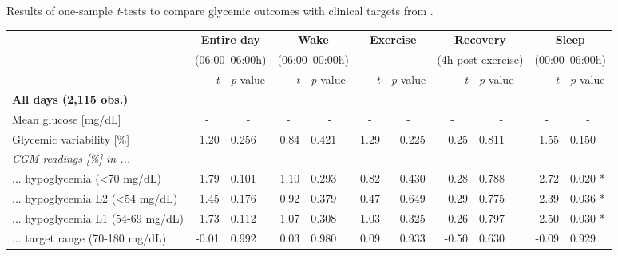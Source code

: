 \documentclass[11pt,a4paper]{article}
\newcommand{\nl}[0]{\textcolor{white}{<}}
\begin{document}
\newpage
\hspace*{-1.2cm}
\begin{threeparttable}
    \caption[Statistical comparison of glycemic outcomes with clinical targets]{Results of one-sample \textit{t}-tests to compare glycemic outcomes with clinical targets from \citet{31177185}.}
    \label{tab:ttest-onesamp}
    \scriptsize
    \centering
    \begin{tabular}{@{}l rl rl rl rl rl@{}}
        \toprule
        & \multicolumn{2}{c}{\textbf{Entire day}} & \multicolumn{2}{c}{\textbf{Wake}} & \multicolumn{2}{c}{\textbf{Exercise}} & \multicolumn{2}{c}{\textbf{Recovery}} & \multicolumn{2}{c}{\textbf{Sleep}}\\
        & \multicolumn{2}{c}{(06:00--06:00h)} & \multicolumn{2}{c}{(06:00--00:00h)} & & & \multicolumn{2}{c}{(4h post-exercise)} & \multicolumn{2}{c}{(00:00--06:00h)}\\
        & \textit{t} & \textit{p}-value & \textit{t} & \textit{p}-value & \textit{t} & \textit{p}-value & \textit{t} & \textit{p}-value & \textit{t} & \textit{p}-value \\ 
        \midrule
        \textbf{All days (2,115 obs.)}\\
        Mean glucose [mg/dL] & \multicolumn{1}{c}{-} & \multicolumn{1}{c}{-} & \multicolumn{1}{c}{-} & \multicolumn{1}{c}{-} & \multicolumn{1}{c}{-} & \multicolumn{1}{c}{-} & \multicolumn{1}{c}{-} & \multicolumn{1}{c}{-} & \multicolumn{1}{c}{-} & \multicolumn{1}{c}{-}\\
        Glycemic variability [\%]                         &  1.20 &  0.256 &  0.84 &  0.421 &  1.29 & \nl0.225     &  0.25 &  0.811 &  1.55 &  0.150   \\
        \textit{CGM readings [\%] in ...} \\
        ... hypoglycemia (<70 mg/dL)                      &  1.79 &  0.101 &  1.10 &  0.293 &  0.82	& \nl0.430     &  0.28 &  0.788 &  2.72 &  0.020 * \\
        \hspace{3mm} ... hypoglycemia L2 (<54 mg/dL)      &  1.45 &  0.176 &  0.92 &  0.379 &  0.47 & \nl0.649     &  0.29 &  0.775 &  2.39 &  0.036 * \\
        \hspace{3mm} ... hypoglycemia L1 (54-69 mg/dL)    &  1.73 &  0.112 &  1.07 &  0.308 &  1.03 & \nl0.325     &  0.26 &  0.797 &  2.50 &  0.030 * \\
        ... target range (70-180 mg/dL)                   & -0.01 &  0.992 &  0.03 &  0.980 &  0.09 & \nl0.933     & -0.50 &  0.630 & -0.09 &  0.929   \\

\end{tabular}
\end{threeparttable}
\end{document}

